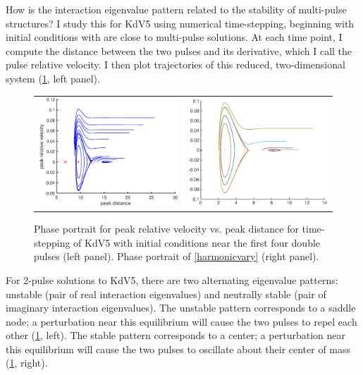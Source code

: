 \documentclass[12pt,reqno,oneside]{article}
\theoremstyle{definition}
\theoremstyle{remark}
\begin{document}
How is the interaction eigenvalue pattern related to the stability of multi-pulse structures? I study this for KdV5 using numerical time-stepping, beginning with initial conditions with are close to multi-pulse solutions. At each time point, I compute the distance between the two pulses and its derivative, which I call the pulse relative velocity. I then plot trajectories of this reduced, two-dimensional system (\cref{fig:KdV5timestep}, left panel). 
\begin{figure}[H]
\begin{center}
\begin{tabular}{cc}
\includegraphics[width=7cm]{images/phaseportrait}  &
\includegraphics[width=7cm]{images/simplephaseportrait}
\end{tabular}
\end{center}
\caption{Phase portrait for peak relative velocity vs. peak distance for time-stepping of KdV5 with initial conditions near the first four double pulses (left panel). Phase portrait of \cref{harmonicvary} (right panel).
}
\label{fig:KdV5timestep}
\end{figure}
For 2-pulse solutions to KdV5, there are two alternating eigenvalue patterns: unstable (pair of real interaction eigenvalues) and neutrally stable (pair of imaginary interaction eigenvalues). The unstable pattern corresponds to a saddle node; a perturbation near this equilibrium will cause the two pulses to repel each other (\cref{fig:KdV5timestep}, left). The stable pattern corresponds to a center; a perturbation near this equilibrium will cause the two pulses to oscillate about their center of mass (\cref{fig:KdV5timestep}, right). 
\end{document}
